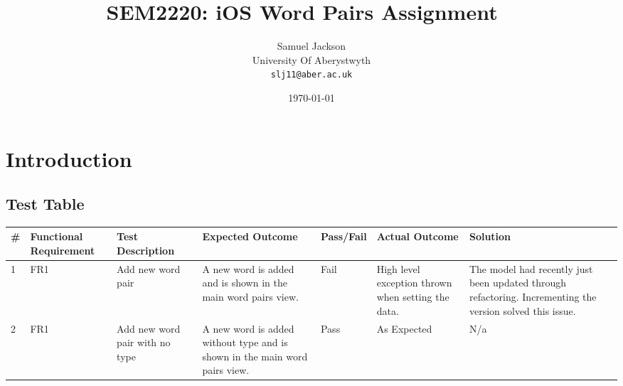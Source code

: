 \documentclass[paper=a4, fontsize=11pt]{scrartcl}	%
\title{
	\vspace{-0.5in} 	\usefont{OT1}{bch}{b}{n}
        SEM2220: iOS Word Pairs Assignment \
}
\author{
	\usefont{OT1}{bch}{m}{n} Samuel Jackson
	\\ \usefont{OT1}{bch}{m}{n} University Of Aberystwyth
	\\   \texttt{slj11@aber.ac.uk}
}
\date{\today}
\numberwithin{equation}{section}															%
\numberwithin{figure}{section}																%
\numberwithin{table}{section}
\begin{document}
\maketitle

\clearpage

\section{Introduction}

\clearpage

\begin{landscape}
\section{Test Table}

\begin{longtable}{|l|p{2cm}|p{5cm}|p{5cm}|l|p{5cm}|p{5cm}|}
\hline
\textbf{\#} & \textbf{Functional Requirement} & \textbf{Test Description}                            & \textbf{Expected Outcome}                                                                                                                                                                                                                  & \textbf{Pass/Fail} & \textbf{Actual Outcome}                            & \textbf{Solution}                                                                                                                                                                                                          \\ \hline \hline \endhead
1  & FR1                    & Add new word pair                                    & A new word is added and is shown in the main word pairs view.                                                                                                                                                                              & Fail      & High level exception thrown when setting the data. & The model had recently just been updated through refactoring. Incrementing the version solved this issue.                                                                                                                  \\ \hline
2  & FR1                    & Add new word pair with no type                       & A new word is added without  type and is shown in the main word pairs view.                                                                                                                                                                & Pass      & As Expected                                        & N/a                                                                                                                                                                                                                        \\ \hline

\end{longtable}
\end{landscape}
\end{document}
